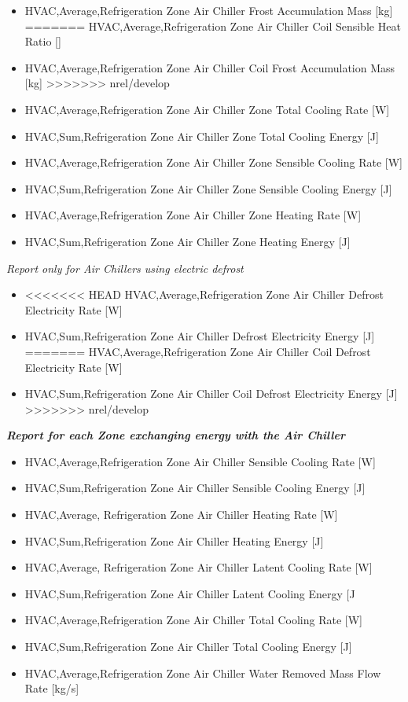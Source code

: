 \begin{itemize}
\item
  HVAC,Average,Refrigeration Zone Air Chiller Frost Accumulation Mass {[}kg{]}
=======
  HVAC,Average,Refrigeration Zone Air Chiller Coil Sensible Heat Ratio {[]}
\item
  HVAC,Average,Refrigeration Zone Air Chiller Coil Frost Accumulation Mass {[}kg{]}
>>>>>>> nrel/develop
\item
  HVAC,Average,Refrigeration Zone Air Chiller Zone Total Cooling Rate {[}W{]}
\item
  HVAC,Sum,Refrigeration Zone Air Chiller Zone Total Cooling Energy {[}J{]}
\item
  HVAC,Average,Refrigeration Zone Air Chiller Zone Sensible Cooling Rate {[}W{]}
\item
  HVAC,Sum,Refrigeration Zone Air Chiller Zone Sensible Cooling Energy {[}J{]}
\item
  HVAC,Average,Refrigeration Zone Air Chiller Zone Heating Rate {[}W{]}
\item
  HVAC,Sum,Refrigeration Zone Air Chiller Zone Heating Energy {[}J{]}
\end{itemize}

\emph{Report only for Air Chillers using electric defrost}

\begin{itemize}
\item
<<<<<<< HEAD
  HVAC,Average,Refrigeration Zone Air Chiller Defrost Electricity Rate {[}W{]}
\item
  HVAC,Sum,Refrigeration Zone Air Chiller Defrost Electricity Energy {[}J{]}
=======
  HVAC,Average,Refrigeration Zone Air Chiller Coil Defrost Electricity Rate {[}W{]}
\item
  HVAC,Sum,Refrigeration Zone Air Chiller Coil Defrost Electricity Energy {[}J{]}
>>>>>>> nrel/develop
\end{itemize}

\textbf{\emph{Report for each Zone exchanging energy with the Air Chiller}}

\begin{itemize}
\item
  HVAC,Average,Refrigeration Zone Air Chiller Sensible Cooling Rate {[}W{]}
\item
  HVAC,Sum,Refrigeration Zone Air Chiller Sensible Cooling Energy {[}J{]}
\item
  HVAC,Average, Refrigeration Zone Air Chiller Heating Rate {[}W{]}
\item
  HVAC,Sum,Refrigeration Zone Air Chiller Heating Energy {[}J{]}
\item
  HVAC,Average, Refrigeration Zone Air Chiller Latent Cooling Rate {[}W{]}
\item
  HVAC,Sum,Refrigeration Zone Air Chiller Latent Cooling Energy {[}J
\item
  HVAC,Average,Refrigeration Zone Air Chiller Total Cooling Rate {[}W{]}
\item
  HVAC,Sum,Refrigeration Zone Air Chiller Total Cooling Energy {[}J{]}
\item
  HVAC,Average,Refrigeration Zone Air Chiller Water Removed Mass Flow Rate {[}kg/s{]}
\end{itemize}

